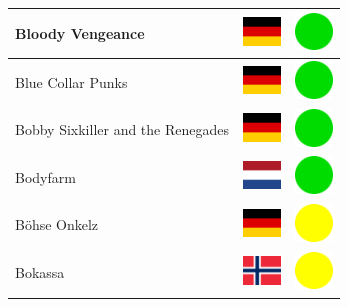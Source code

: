 \documentclass[12pt, a4paper, twoside]{report}
\begin{document}
\begin{center}
\begin{longtable}{|p{5cm}|p{2cm}|p{2cm}|}
 Bloody Vengeance                                           & \includegraphics[width=1cm]{../4x3/de} &   \includegraphics[width=1cm]{../likes/y} \\ \hline
 Blue Collar Punks                                          & \includegraphics[width=1cm]{../4x3/de} &   \includegraphics[width=1cm]{../likes/y} \\ \hline
 Bobby Sixkiller and the Renegades                          & \includegraphics[width=1cm]{../4x3/de} &   \includegraphics[width=1cm]{../likes/y} \\ \hline
 Bodyfarm                                                   & \includegraphics[width=1cm]{../4x3/nl} &   \includegraphics[width=1cm]{../likes/y} \\ \hline
 Böhse Onkelz                                               & \includegraphics[width=1cm]{../4x3/de} &   \includegraphics[width=1cm]{../likes/m} \\ \hline
 Bokassa                                                    & \includegraphics[width=1cm]{../4x3/no} &   \includegraphics[width=1cm]{../likes/m} \\ \hline

\end{longtable}
\end{center}
\end{document}
